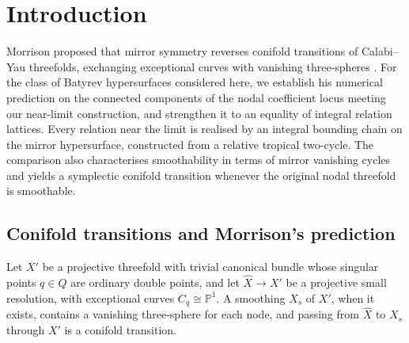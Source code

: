 \section{Introduction}\label{sec:intro}

Morrison proposed that mirror symmetry reverses conifold transitions of Calabi--Yau threefolds, exchanging
exceptional curves with vanishing three-spheres \cite{Mor99}. For the class of Batyrev hypersurfaces considered here,
we establish his numerical prediction on the connected components of the nodal coefficient locus meeting our
near-limit construction, and strengthen it to an equality of integral relation lattices. Every relation near the limit
is realised by an integral bounding chain on the mirror hypersurface, constructed from a relative tropical two-cycle. The comparison also characterises
smoothability in terms of mirror vanishing cycles and yields a symplectic conifold transition whenever the original
nodal threefold is smoothable.

\subsection{Conifold transitions and Morrison's prediction}
Let $X'$ be a projective threefold with trivial canonical bundle whose singular points $q\in Q$ are ordinary double
points, and let $\widehat X\to X'$ be a projective small resolution, with exceptional curves $C_q\cong\mathbb P^1$. A smoothing
$X_s$ of $X'$, when it exists, contains a vanishing three-sphere for each node, and passing from $\widehat X$ to $X_s$
through $X'$ is a conifold transition.

